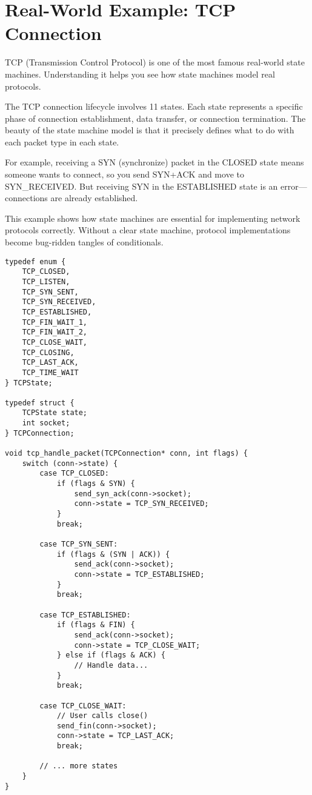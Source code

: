 \section{Real-World Example: TCP Connection}

TCP (Transmission Control Protocol) is one of the most famous real-world state machines. Understanding it helps you see how state machines model real protocols.

The TCP connection lifecycle involves 11 states. Each state represents a specific phase of connection establishment, data transfer, or connection termination. The beauty of the state machine model is that it precisely defines what to do with each packet type in each state.

For example, receiving a SYN (synchronize) packet in the CLOSED state means someone wants to connect, so you send SYN+ACK and move to SYN\_RECEIVED. But receiving SYN in the ESTABLISHED state is an error---connections are already established.

This example shows how state machines are essential for implementing network protocols correctly. Without a clear state machine, protocol implementations become bug-ridden tangles of conditionals.

\begin{lstlisting}
typedef enum {
    TCP_CLOSED,
    TCP_LISTEN,
    TCP_SYN_SENT,
    TCP_SYN_RECEIVED,
    TCP_ESTABLISHED,
    TCP_FIN_WAIT_1,
    TCP_FIN_WAIT_2,
    TCP_CLOSE_WAIT,
    TCP_CLOSING,
    TCP_LAST_ACK,
    TCP_TIME_WAIT
} TCPState;

typedef struct {
    TCPState state;
    int socket;
} TCPConnection;

void tcp_handle_packet(TCPConnection* conn, int flags) {
    switch (conn->state) {
        case TCP_CLOSED:
            if (flags & SYN) {
                send_syn_ack(conn->socket);
                conn->state = TCP_SYN_RECEIVED;
            }
            break;

        case TCP_SYN_SENT:
            if (flags & (SYN | ACK)) {
                send_ack(conn->socket);
                conn->state = TCP_ESTABLISHED;
            }
            break;

        case TCP_ESTABLISHED:
            if (flags & FIN) {
                send_ack(conn->socket);
                conn->state = TCP_CLOSE_WAIT;
            } else if (flags & ACK) {
                // Handle data...
            }
            break;

        case TCP_CLOSE_WAIT:
            // User calls close()
            send_fin(conn->socket);
            conn->state = TCP_LAST_ACK;
            break;

        // ... more states
    }
}
\end{lstlisting}

